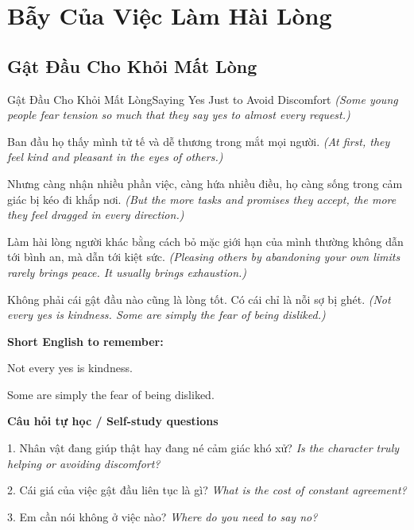\chapter{Bẫy Của Việc Làm Hài Lòng}

\section{Gật Đầu Cho Khỏi Mất Lòng}
\begin{truyen}{Gật Đầu Cho Khỏi Mất Lòng}{Saying Yes Just to Avoid Discomfort}
\textit{(Some young people fear tension so much that they say yes to almost every request.)}

Ban đầu họ thấy mình tử tế và dễ thương trong mắt mọi người.
\textit{(At first, they feel kind and pleasant in the eyes of others.)}

Nhưng càng nhận nhiều phần việc, càng hứa nhiều điều, họ càng sống trong cảm giác bị kéo đi khắp nơi.
\textit{(But the more tasks and promises they accept, the more they feel dragged in every direction.)}

Làm hài lòng người khác bằng cách bỏ mặc giới hạn của mình thường không dẫn tới bình an, mà dẫn tới kiệt sức.
\textit{(Pleasing others by abandoning your own limits rarely brings peace. It usually brings exhaustion.)}

\end{truyen}

\begin{baihoc}
Không phải cái gật đầu nào cũng là lòng tốt. Có cái chỉ là nỗi sợ bị ghét.
\textit{(Not every yes is kindness. Some are simply the fear of being disliked.)}
\end{baihoc}

\begin{ghinhoanh}
\textbf{Short English to remember:}

Not every yes is kindness.

Some are simply the fear of being disliked.

\end{ghinhoanh}

\begin{tuhocnhanh}
\textbf{Câu hỏi tự học / Self-study questions}

1. Nhân vật đang giúp thật hay đang né cảm giác khó xử? \textit{Is the character truly helping or avoiding discomfort?}

2. Cái giá của việc gật đầu liên tục là gì? \textit{What is the cost of constant agreement?}

3. Em cần nói không ở việc nào? \textit{Where do you need to say no?}
\end{tuhocnhanh}
\ngancach

